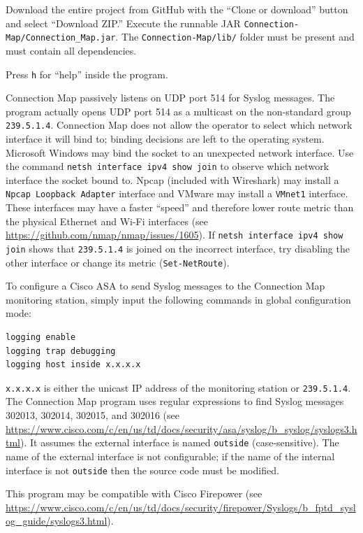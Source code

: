 \documentclass[12pt]{article}
\begin{document}
Download the entire project from GitHub with the ``Clone or download'' button and select ``Download ZIP.'' Execute the runnable JAR \texttt{Connection-Map/Connection\_Map.jar}. The \texttt{Connection-Map/lib/} folder must be present and must contain all dependencies.

Press \texttt{h} for ``help'' inside the program.

Connection Map passively listens on UDP port 514 for Syslog messages. The program actually opens UDP port 514 as a multicast on the non-standard group \texttt{239.5.1.4}. Connection Map does not allow the operator to select which network interface it will bind to; binding decisions are left to the operating system. Microsoft Windows may bind the socket to an unexpected network interface. Use the command \texttt{netsh interface ipv4 show join} to observe which network interface the socket bound to. Npcap (included with Wireshark) may install a \texttt{Npcap Loopback Adapter} interface and VMware may install a \texttt{VMnet1} interface. These interfaces may have a faster ``speed'' and therefore lower route metric than the physical Ethernet and Wi-Fi interfaces (see \url{https://github.com/nmap/nmap/issues/1605}). If \texttt{netsh interface ipv4 show join} shows that \texttt{239.5.1.4} is joined on the incorrect interface, try disabling the other interface or change its metric (\texttt{Set-NetRoute}).

To configure a Cisco ASA to send Syslog messages to the Connection Map monitoring station, simply input the following commands in global configuration mode:

\begin{lstlisting}
logging enable
logging trap debugging
logging host inside x.x.x.x
\end{lstlisting}

\texttt{x.x.x.x} is either the unicast IP address of the monitoring station or \texttt{239.5.1.4}. The Connection Map program uses regular expressions to find Syslog messages 302013, 302014, 302015, and 302016 (see \url{https://www.cisco.com/c/en/us/td/docs/security/asa/syslog/b_syslog/syslogs3.html}). It assumes the external interface is named \texttt{outside} (case-sensitive). The name of the external interface is not configurable; if the name of the internal interface is not \texttt{outside} then the source code must be modified.

This program may be compatible with Cisco Firepower (see \url{https://www.cisco.com/c/en/us/td/docs/security/firepower/Syslogs/b_fptd_syslog_guide/syslogs3.html}).
\end{document}
